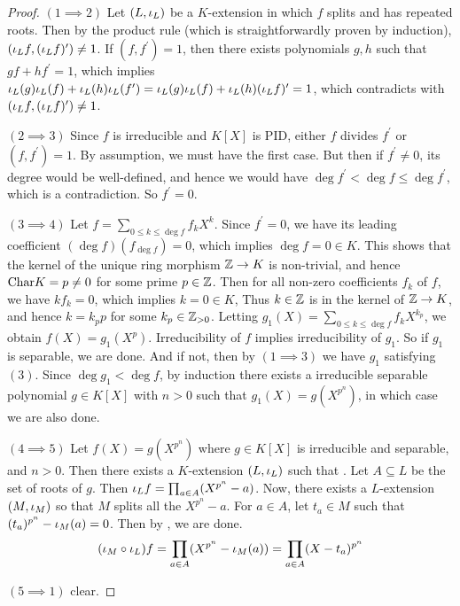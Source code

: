 \documentclass[main.tex]{subfiles}
\begin{document}
\begin{proof}
  $(1 \implies 2)$ Let $(L,\iota_L)$ be a $K$-extension in which $f$ splits and 
  has repeated roots. 
  Then by the product rule (which is straightforwardly proven by induction), 
  $(\iota_L f, (\iota_L f)^\prime) \neq 1$. 
  If $(f,f^\prime) = 1$, then there exists polynomials $g, h$ such that 
  $g f + h f^\prime = 1$, 
  which implies $\iota_L(g) \iota_L(f) + \iota_L(h) \iota_L(f^\prime) = 
  \iota_L(g) \iota_L(f) + \iota_L(h) (\iota_L f)^\prime = 1$,
  which contradicts with $(\iota_L f, (\iota_L f)^\prime) \neq 1$. 

  $(2 \implies 3)$ Since $f$ is irreducible and $K[X]$ is PID, 
  either $f$ divides $f^\prime$ or $(f,f^\prime) = 1$. 
  By assumption, we must have the first case. 
  But then if $f^\prime \neq 0$, its degree would be well-defined,
  and hence we would have $\deg f^\prime < \deg f \leq \deg f^\prime$,
  which is a contradiction. 
  So $f^\prime = 0$. 

  $(3 \implies 4)$ Let $f = \sum_{0 \leq k \leq \deg f} f_k X^k$. 
  Since $f^\prime = 0$, 
  we have its leading coefficient $(\deg f)(f_{\deg f}) = 0$,
  which implies $\deg f = 0 \in K$. 
  This shows that the kernel of the unique ring morphism $\mathbb{Z} \to K$ 
  is non-trivial, and hence $\mathrm{Char}K = p \neq 0$ for some prime $p \in \mathbb{Z}$. 
  Then for all non-zero coefficients $f_k$ of $f$,
  we have $k f_k = 0$, which implies $k = 0 \in K$,
  Thus $k \in \mathbb{Z}$ is in the kernel of $\mathbb{Z} \to K$,
  and hence $k = k_p p$ for some $k_p \in \mathbb{Z}_{> 0}$. 
  Letting $g_1(X) = \sum_{0 \leq k \leq \deg f} f_k X^{k_p}$,
  we obtain $f(X) = g_1(X^p)$. 
  Irreducibility of $f$ implies irreducibility of $g_1$.
  So if $g_1$ is separable, we are done.
  And if not, then by $(1 \implies 3)$ we have $g_1$ satisfying $(3)$. 
  Since $\deg g_1 < \deg f$, by induction
  there exists a irreducible separable polynomial $g \in K[X]$ with $n > 0$
  such that $g_1(X) = g(X^{p^n})$,
  in which case we are also done. 

  $(4 \implies 5)$ Let $f(X) = g(X^{p^n})$ where 
  $g \in K[X]$ is irreducible and separable, and $n > 0$. 
  Then there exists a $K$-extension $(L,\iota_L)$ such that
  . 
  Let $A \subseteq L$ be the set of roots of $g$. 
  Then $\iota_L f = \prod_{a \in A} (X^{p^n} - a)$. 
  Now, there exists a $L$-extension $(M,\iota_M)$
  so that $M$ splits all the $X^{p^n} - a$. 
  For $a \in A$, let $t_a \in M$ such that $(t_a)^{p^n} - \iota_M(a) = 0$. 
  Then by , we are done. \[
    (\iota_M \circ \iota_L) f = \prod_{a \in A} (X^{p^n} - \iota_M(a))
    = \prod_{a \in A} (X - t_a)^{p^n}
  \]

  $(5 \implies 1)$ clear. 
\end{proof}
\end{document}
